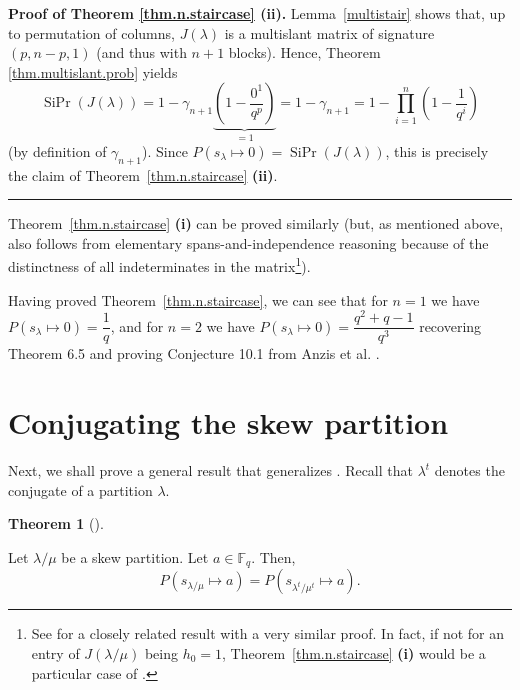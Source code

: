 \documentclass[numbers=enddot,12pt,final,onecolumn,notitlepage]{scrartcl}%
\theoremstyle{definition}
\newtheorem{theo}{Theorem}[section]
\newenvironment{theorem}[1][]
{\begin{theo}[#1]\begin{leftbar}}
{\end{leftbar}\end{theo}}
\newenvironment{proof}[1][Proof]{\noindent\textbf{#1.} }{\ \rule{0.5em}{0.5em}}
\let\prodnonlimits\prod
\renewcommand{\prod}{\prodnonlimits\limits}
\newcommand{\tup}[1]{\left( #1 \right)}
\newcommand{\Fq}{\mathbb{F}_q}
\theoremstyle{plainsl}
\begin{document}
\begin{proof}[Proof of Theorem \ref{thm.n.staircase} \textbf{(ii)}]
Lemma~\ref{multistair} shows that, up to permutation of columns,
$J(\lambda)$ is a multislant matrix of signature $(p, n-p, 1)$
(and thus with $n+1$ blocks).
Hence, Theorem \ref{thm.multislant.prob} yields
\[
\operatorname*{SiPr}\tup{J\tup{\lambda}}
= 1 - \gamma_{n+1} \underbrace{\tup{1 - \dfrac{0^1}{q^p}}}_{= 1}
= 1 - \gamma_{n+1}
= 1 - \prod_{i=1}^{n} \left(  1-\dfrac{1}{q^{i}}\right)
\]
(by definition of $\gamma_{n+1}$).
Since $P(s_{\lambda} \mapsto 0) = \operatorname*{SiPr}\tup{J\tup{\lambda}}$,
this is precisely the claim of Theorem~\ref{thm.n.staircase} \textbf{(ii)}.
\end{proof}

Theorem~\ref{thm.n.staircase} \textbf{(i)} can be proved similarly
(but, as mentioned above, also follows from elementary
spans-and-independence reasoning because of the distinctness of
all indeterminates in the matrix\footnote{See
\cite[Theorem 1]{Haglund} for a closely related result with a
very similar proof. In fact, if not for an entry of $J\tup{\lambda/\mu}$
being $h_0 = 1$, Theorem~\ref{thm.n.staircase} \textbf{(i)} would be
a particular case of \cite[Theorem 1]{Haglund}.}).

Having proved Theorem~\ref{thm.n.staircase}, we can see that for $n=1$
we have
$P(s_{\lambda} \mapsto 0) = \dfrac{1}{q}$, and for $n=2$ we have
$P(s_{\lambda} \mapsto 0) = \dfrac{q^2+q-1}{q^3}$
recovering Theorem 6.5 and proving Conjecture 10.1 from Anzis et al. \cite{Anzis18}.


\section{Conjugating the skew partition}

Next, we shall prove a general result that generalizes
\cite[Corollary 3.3]{Anzis18}.
Recall that $\lambda^{t}$ denotes the conjugate of a
partition $\lambda$.

\begin{theorem}
\label{thm.transpose}Let $\lambda/\mu$ be a skew partition. Let $a\in
\Fq$. Then,
\[
P\left(  s_{\lambda/\mu}\mapsto a\right)  =P\left(  s_{\lambda^{t}/\mu^{t}%
}\mapsto a\right)  .
\]
\end{theorem}
\end{document}
